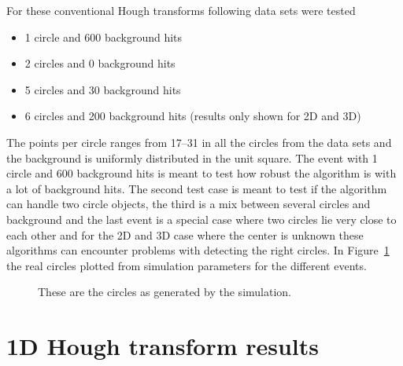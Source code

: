 \documentclass[11pt]{scrreprt}
\begin{document}
For these conventional Hough transforms following data sets were tested

\begin{itemize}
  \item 1 circle and 600 background hits
  \item 2 circles and 0 background hits
  \item 5 circles and 30 background hits
  \item 6 circles and 200 background hits (results only shown for 2D and 3D)
\end{itemize}


The points per circle ranges from 17--31 in all the circles from the data sets
and the background is uniformly distributed in the unit square. The event with 1
circle and 600 background hits is meant to test how robust the algorithm is with a 
lot of background hits. The second test case is meant to test if the algorithm can handle
two circle objects, the third is a mix between several circles and background and the last
event is a special case where two circles lie very close to each other and for the 2D
and 3D case where the center is unknown these algorithms can encounter problems with
detecting the right circles. In Figure~\ref{fig:real_ht_results}
the real circles plotted from simulation parameters for the different events.

\begin{figure}
\centering
                \label{fig:real_1c600bg}%
                \label{fig:real_2c0bg}

                \label{fig:real_5c30bg}%
                \label{fig:real_6c_200bg}%
        \caption{These are the circles as generated by the simulation.\label{fig:real_ht_results}}
\end{figure}

\section{1D Hough transform results} %
\label{sec:1d_hough_transform_results}
\end{document}
